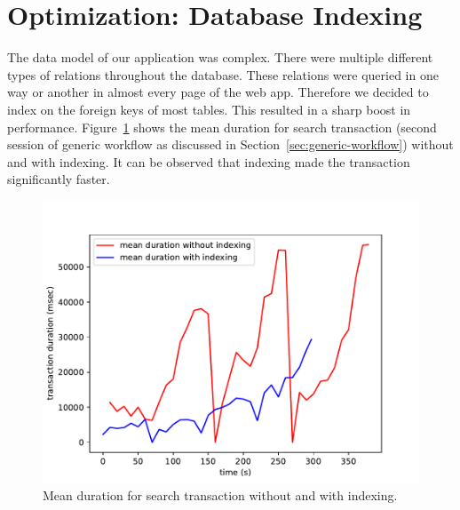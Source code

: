 \section{Optimization: Database Indexing}
The data model of our application was complex. There were multiple different types of relations throughout the database. These relations were queried in one way or another in almost every page of the web app. Therefore we decided to index on the foreign keys of most tables. This resulted in a sharp boost in performance. Figure~\ref{fig:dbindex} shows the mean duration for search transaction (second session of generic workflow as discussed in Section~\ref{sec:generic-workflow}) without and with indexing. It can be observed that indexing made the transaction significantly faster.
\begin{figure}
	\centering
	\includegraphics{images/search-transaction-duration-without-indexing-with-indexing}
	\caption{Mean duration for search transaction without and with indexing.}\label{fig:dbindex}
\end{figure}

